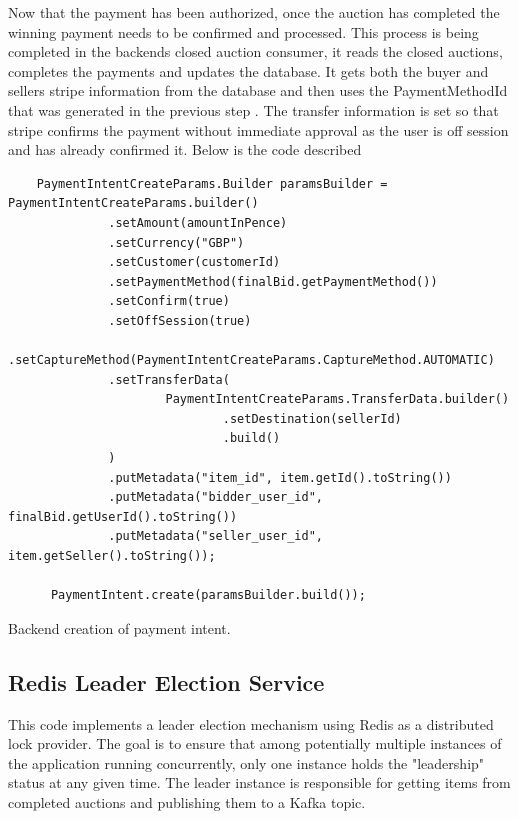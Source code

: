 \documentclass[]{project_report}
\begin{document}
Now that the payment has been authorized, once the auction has completed the winning payment needs to be confirmed and processed. This process is being completed in the backends closed auction consumer, it reads the closed auctions, completes the payments and updates the database. It gets both the buyer and sellers stripe information from the database and then uses the PaymentMethodId that was generated in the previous step \label{code:confirmSetupIntent}. The transfer information is set so that stripe confirms the payment without immediate approval as the user is off session and has already confirmed it. Below is the code described \label{code:createPaymentIntent}

\begin{codeblock}[H]
    \begin{verbatim}
    PaymentIntentCreateParams.Builder paramsBuilder = PaymentIntentCreateParams.builder()
              .setAmount(amountInPence)
              .setCurrency("GBP")
              .setCustomer(customerId)
              .setPaymentMethod(finalBid.getPaymentMethod())
              .setConfirm(true)
              .setOffSession(true)
              .setCaptureMethod(PaymentIntentCreateParams.CaptureMethod.AUTOMATIC)
              .setTransferData(
                      PaymentIntentCreateParams.TransferData.builder()
                              .setDestination(sellerId)
                              .build()
              )
              .putMetadata("item_id", item.getId().toString())
              .putMetadata("bidder_user_id", finalBid.getUserId().toString())
              .putMetadata("seller_user_id", item.getSeller().toString());

      PaymentIntent.create(paramsBuilder.build());
\end{verbatim}
    \caption{Backend creation of payment intent.}
    \label{code:createPaymentIntent}
\end{codeblock}


\subsection{Redis Leader Election Service }

This code implements a leader election mechanism using Redis as a distributed lock provider. The goal is to ensure that among potentially multiple instances of the application running concurrently, only one instance holds the "leadership" status at any given time. The leader instance is responsible for getting items from completed auctions and publishing them to a Kafka topic.
\end{document}
